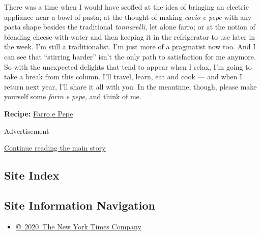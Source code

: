 There was a time when I would have scoffed at the idea of bringing an
electric appliance near a bowl of pasta; at the thought of making
\emph{cacio e pepe} with any pasta shape besides the traditional
\emph{tonnarelli,} let alone farro; or at the notion of blending cheese
with water and then keeping it in the refrigerator to use later in the
week. I'm still a traditionalist. I'm just more of a pragmatist now too.
And I can see that ``stirring harder'' isn't the only path to
satisfaction for me anymore. So with the unexpected delights that tend
to appear when I relax, I'm going to take a break from this column. I'll
travel, learn, eat and cook --- and when I return next year, I'll share
it all with you. In the meantime, though, please make yourself some
\emph{farro e pepe,} and think of me.

\textbf{Recipe:}
\href{https://cooking.nytimes3xbfgragh.onion/recipes/1020356-farro-e-pepe}{Farro
e Pepe}

Advertisement

\protect\hyperlink{after-bottom}{Continue reading the main story}

\hypertarget{site-index}{%
\subsection{Site Index}\label{site-index}}

\hypertarget{site-information-navigation}{%
\subsection{Site Information
Navigation}\label{site-information-navigation}}

\begin{itemize}
\tightlist
\item
  \href{https://help.nytimes3xbfgragh.onion/hc/en-us/articles/115014792127-Copyright-notice}{©~2020~The
  New York Times Company}
\end{itemize}

